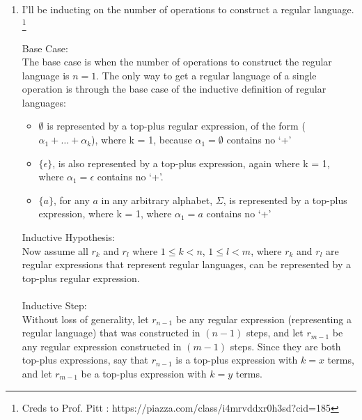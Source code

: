 
\usepackage{amsmath}

\oddsidemargin 0in
\evensidemargin 0in
\textwidth 6.5in
\topmargin -0.5in
\textheight 9.0in
\newcommand{\norm}[1]{\left\lVert #1 \right\rVert}


\pagestyle{myheadings}

\begin{enumerate}
\item
  I'll be inducting on the number of operations to construct a regular language. \footnote{Creds to Prof. Pitt : https://piazza.com/class/i4mrvddxr0h3sd?cid=185}\\\\

  Base Case:\\
  The base case is when the number of operations to construct the regular language is $n = 1$. The only way to get a regular language of a single operation is through the base case of the inductive definition of regular languages:
  \begin{itemize}
  \item $\emptyset$ is represented by a top-plus regular expression, of the form ($\alpha_1 + \ldots + \alpha_k$), where k = 1, because $\alpha_1 = \emptyset$ contains no `+'
  \item $\{\epsilon\}$, is also represented by a top-plus expression, again where k = 1, where $\alpha_1 = \epsilon$ contains no `+'.
  \item $\{a\}$, for any $a$ in any arbitrary alphabet, $\Sigma$, is represented by a top-plus expression, where k = 1, where $\alpha_1 = a$ contains no `+'
  \end{itemize}
  Inductive Hypothesis:\\
  Now assume all $r_k$ and $r_l$ where $1 \leq k < n$, $1 \leq l < m$, where $r_k$ and $r_l$ are regular expressions that represent regular languages, can be represented by a top-plus regular expression.\\\\
  Inductive Step:\\
  Without loss of generality, let $r_{n-1}$ be any regular expression (representing a regular language) that was constructed in $(n-1)$ steps, and let $r_{m-1}$ be any regular expression constructed in $(m-1)$ steps. Since they are both top-plus expressions, say that $r_{n-1}$ is a top-plus expression with $k=x$ terms, and let $r_{m-1}$ be a top-plus expression with $k=y$ terms.\\

\end{enumerate}
